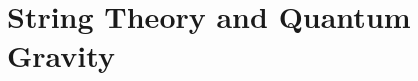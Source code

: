 \documentclass[book.tex]{subfiles}
\begin{document}
\chapter{String Theory and Quantum Gravity}
\end{document}
